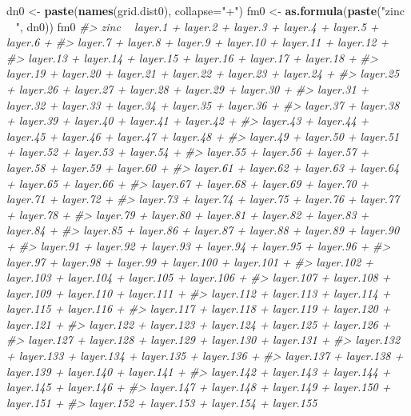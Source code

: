 \documentclass[graybox,natbib,nospthms,UStrade]{svmono}
\newenvironment{Shaded}{\begin{snugshade}}{\end{snugshade}}
\newcommand{\CommentTok}[1]{\textcolor[rgb]{0.37,0.37,0.37}{\textit{#1}}}
\newcommand{\DataTypeTok}[1]{\textcolor[rgb]{0.27,0.27,0.27}{#1}}
\newcommand{\KeywordTok}[1]{\textcolor[rgb]{0.27,0.27,0.27}{\textbf{#1}}}
\newcommand{\NormalTok}[1]{#1}
\newcommand{\StringTok}[1]{\textcolor[rgb]{0.5,0.5,0.5}{#1}}
\begin{document}
\begin{Shaded}
\begin{Highlighting}[]
\NormalTok{dn0 <-}\StringTok{ }\KeywordTok{paste}\NormalTok{(}\KeywordTok{names}\NormalTok{(grid.dist0), }\DataTypeTok{collapse=}\StringTok{"+"}\NormalTok{)}
\NormalTok{fm0 <-}\StringTok{ }\KeywordTok{as.formula}\NormalTok{(}\KeywordTok{paste}\NormalTok{(}\StringTok{"zinc ~ "}\NormalTok{, dn0))}
\NormalTok{fm0}
\CommentTok{#> zinc ~ layer.1 + layer.2 + layer.3 + layer.4 + layer.5 + layer.6 + }
\CommentTok{#>     layer.7 + layer.8 + layer.9 + layer.10 + layer.11 + layer.12 + }
\CommentTok{#>     layer.13 + layer.14 + layer.15 + layer.16 + layer.17 + layer.18 + }
\CommentTok{#>     layer.19 + layer.20 + layer.21 + layer.22 + layer.23 + layer.24 + }
\CommentTok{#>     layer.25 + layer.26 + layer.27 + layer.28 + layer.29 + layer.30 + }
\CommentTok{#>     layer.31 + layer.32 + layer.33 + layer.34 + layer.35 + layer.36 + }
\CommentTok{#>     layer.37 + layer.38 + layer.39 + layer.40 + layer.41 + layer.42 + }
\CommentTok{#>     layer.43 + layer.44 + layer.45 + layer.46 + layer.47 + layer.48 + }
\CommentTok{#>     layer.49 + layer.50 + layer.51 + layer.52 + layer.53 + layer.54 + }
\CommentTok{#>     layer.55 + layer.56 + layer.57 + layer.58 + layer.59 + layer.60 + }
\CommentTok{#>     layer.61 + layer.62 + layer.63 + layer.64 + layer.65 + layer.66 + }
\CommentTok{#>     layer.67 + layer.68 + layer.69 + layer.70 + layer.71 + layer.72 + }
\CommentTok{#>     layer.73 + layer.74 + layer.75 + layer.76 + layer.77 + layer.78 + }
\CommentTok{#>     layer.79 + layer.80 + layer.81 + layer.82 + layer.83 + layer.84 + }
\CommentTok{#>     layer.85 + layer.86 + layer.87 + layer.88 + layer.89 + layer.90 + }
\CommentTok{#>     layer.91 + layer.92 + layer.93 + layer.94 + layer.95 + layer.96 + }
\CommentTok{#>     layer.97 + layer.98 + layer.99 + layer.100 + layer.101 + }
\CommentTok{#>     layer.102 + layer.103 + layer.104 + layer.105 + layer.106 + }
\CommentTok{#>     layer.107 + layer.108 + layer.109 + layer.110 + layer.111 + }
\CommentTok{#>     layer.112 + layer.113 + layer.114 + layer.115 + layer.116 + }
\CommentTok{#>     layer.117 + layer.118 + layer.119 + layer.120 + layer.121 + }
\CommentTok{#>     layer.122 + layer.123 + layer.124 + layer.125 + layer.126 + }
\CommentTok{#>     layer.127 + layer.128 + layer.129 + layer.130 + layer.131 + }
\CommentTok{#>     layer.132 + layer.133 + layer.134 + layer.135 + layer.136 + }
\CommentTok{#>     layer.137 + layer.138 + layer.139 + layer.140 + layer.141 + }
\CommentTok{#>     layer.142 + layer.143 + layer.144 + layer.145 + layer.146 + }
\CommentTok{#>     layer.147 + layer.148 + layer.149 + layer.150 + layer.151 + }
\CommentTok{#>     layer.152 + layer.153 + layer.154 + layer.155}
\end{Highlighting}
\end{Shaded}
\end{document}
